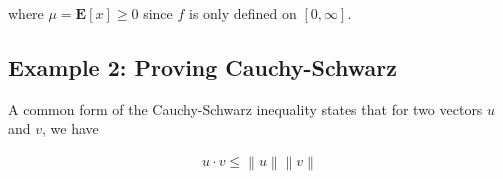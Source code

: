 \documentclass[a4paper,11pt]{book}
\begin{document}
where $\mu = \mathbf{E}[x] \geq 0$ since $f$ is only defined on $[0, \infty]$.

\subsection{Example 2: Proving Cauchy-Schwarz}

A common form of the Cauchy-Schwarz inequality states that for two vectors $u$ and $v$, we have

\newcommand\norm[1]{\left\lVert#1\right\rVert}
\begin{eqnarray*}
u \cdot v  \leq \norm{u}\norm{v}
\end{eqnarray*}
\end{document}
